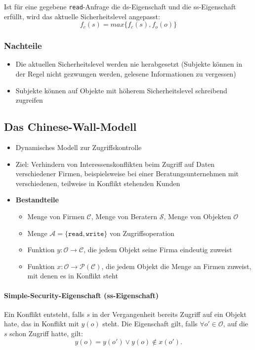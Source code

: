 Ist für eine gegebene \texttt{read}-Anfrage die ds-Eigenschaft und die ss-Eigenschaft erfüllt, wird das aktuelle Sicherheitslevel angepasst:
\[f_c(s) = max\big\{f_c(s),f_o(o)\big\}\]

\subsubsection{Nachteile}
\begin{itemize}
	\item Die aktuellen Sicherheitslevel werden nie herabgesetzt (Subjekte können in der Regel nicht gezwungen werden, gelesene Informationen zu vergessen)
	\item Subjekte können auf Objekte mit höherem Sicherheitslevel schreibend zugreifen
\end{itemize}


\subsection{Das Chinese-Wall-Modell}
\begin{itemize}
	\item Dynamisches Modell zur Zugriffskontrolle
	\item Ziel: Verhindern von Interessenskonflikten beim Zugriff auf Daten verschiedener Firmen, beispielsweise bei einer Beratungsunternehmen mit verschiedenen, teilweise in Konflikt stehenden Kunden
	\item \textbf{Bestandteile}
	\begin{itemize}
		\item Menge von Firmen \(\mathcal{C}\), Menge von Beratern \(\mathcal{S}\), Menge von Objekten \(\mathcal{O}\)
		\item Menge \(\mathcal{A} = \{\texttt{read},\texttt{write}\}\) von Zugriffsoperation
		\item Funktion \(y: \mathcal{O} \rightarrow \mathcal{C}\), die jedem Objekt seine Firma eindeutig zuweist
		\item Funktion \(x: \mathcal{O} \rightarrow \mathcal{P}(\mathcal{C})\), die jedem Objekt die Menge an Firmen zuweist, mit denen es in Konflikt steht
	\end{itemize}
\end{itemize}

\paragraph{Simple-Security-Eigenschaft (ss-Eigenschaft)}
Ein Konflikt entsteht, falls \(s\) in der Vergangenheit bereits Zugriff auf ein Objekt hate, das in Konflikt mit \(y(o)\) steht. Die Eigenschaft gilt, falls \(\forall o' \in \mathcal{O}\), auf die \(s\) schon Zugriff hatte, gilt:
\[y(o) = y(o') \vee y(o) \notin x(o').\]

